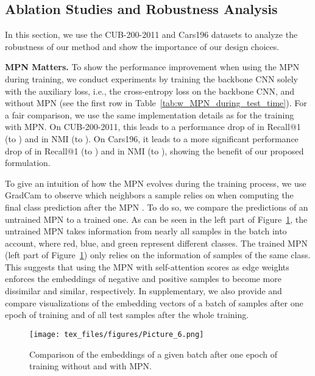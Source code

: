 \documentclass{article}
\begin{document}
\vspace{-0.2cm}
\subsection{Ablation Studies and Robustness Analysis}
\label{subsec:ablations}

In this section, we use the CUB-200-2011 \cite{WahCUB_200_2011} and Cars196 \cite{KrauseStarkDengFei-Fei_3DRR2013} datasets to analyze the robustness of our method and show the importance of our design choices.

\noindent\textbf{MPN Matters.} To show the performance improvement when using the MPN during training, we conduct experiments by training the backbone CNN solely with the auxiliary loss, i.e., the cross-entropy loss on the backbone CNN, and without MPN (see the first row in Table~\ref{tab:w_MPN_during_test_time}). For a fair comparison, we use the same implementation details as for the training with MPN. On CUB-200-2011, this leads to a performance drop of  in Recall@1 (to ) and  in NMI (to ). On Cars196, it leads to a more significant performance drop of  in Recall@1 (to ) and  in NMI (to ), showing the benefit of our proposed formulation. 

To give an intuition of how the MPN evolves during the training process, we use GradCam \cite{DBLP:journals/ijcv/SelvarajuCDVPB20} to observe which neighbors a sample relies on when computing the final class prediction after the MPN \cite{DBLP:journals/ijcv/SelvarajuCDVPB20}. To do so, we compare the predictions of an untrained MPN to a trained one. As can be seen in the left part of Figure~\ref{fig:trained_untrained}, the untrained MPN takes information from nearly all samples in the batch into account, where red, blue, and green represent different classes. The trained MPN (left part of Figure~\ref{fig:trained_untrained}) only relies on the information of samples of the same class. This suggests that using the MPN with self-attention scores as edge weights enforces the embeddings of negative and positive samples to become more dissimilar and similar, respectively. In supplementary, we also provide and compare visualizations of the embedding vectors of a batch of samples after one epoch of training and of all test samples after the whole training.

\begin{figure}
    \centering
    \texttt{[image: tex\_files/figures/Picture\_6.png]}
    \caption{Comparison of the embeddings of a given batch after one epoch of training without and with MPN.}
\label{fig:trained_untrained}
\end{figure}
\end{document}
